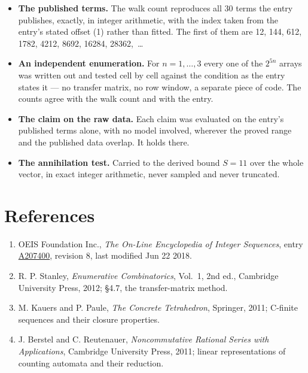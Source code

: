 \documentclass[11pt]{article}
\theoremstyle{definition}
\begin{document}
\begin{itemize}

\item {\bfseries The published terms.} The walk count reproduces all 30 terms the entry publishes, exactly, in integer arithmetic, with the index taken from the entry's stated offset (1) rather than fitted. The first of them are 12, 144, 612, 1782, 4212, 8692, 16284, 28362,~\dots

\item {\bfseries An independent enumeration.} For $n = 1,\dots,3$ every one of the $2^{5n}$ arrays was written out and tested cell by cell against the condition as the entry states it --- no transfer matrix, no row window, a separate piece of code. The counts agree with the walk count and with the entry.

\item {\bfseries The claim on the raw data.} Each claim was evaluated on the entry's published terms alone, with no model involved, wherever the proved range and the published data overlap. It holds there.

\item {\bfseries The annihilation test.} Carried to the derived bound $S = 11$ over the whole vector, in exact integer arithmetic, never sampled and never truncated.

\end{itemize}

\section{References}

\begin{enumerate}

\item OEIS Foundation Inc., \emph{The On-Line Encyclopedia of Integer Sequences}, entry \href{https://oeis.org/A207400}{A207400}, revision 8, last modified Jun 22 2018.

\item R. P. Stanley, \emph{Enumerative Combinatorics}, Vol.~1, 2nd ed., Cambridge University Press, 2012; \S4.7, the transfer-matrix method.

\item M. Kauers and P. Paule, \emph{The Concrete Tetrahedron}, Springer, 2011; C-finite sequences and their closure properties.

\item J. Berstel and C. Reutenauer, \emph{Noncommutative Rational Series with Applications}, Cambridge University Press, 2011; linear representations of counting automata and their reduction.

\end{enumerate}
\end{document}
